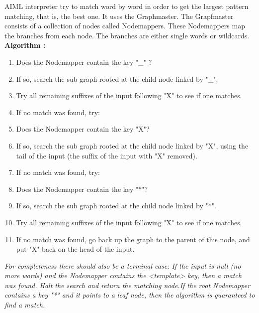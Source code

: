 \documentclass[12pt,twoside]{article}
\theoremstyle{plain}
\theoremstyle{definition}
\theoremstyle{remark}
\begin{document}
		AIML interpreter try to match word by word in order to get the largest pattern matching, that is, the best one. It uses the Graphmaster. The Grapfmaster consists of a collection of nodes called Nodemappers. These Nodemappers map the branches from each node. The branches are either single words or wildcards. \\ 
		
\textbf{Algorithm : } 
		
		\begin{enumerate} 
		\item Does the Nodemapper contain the key "\_" ?

			\item If so, search the sub graph rooted at the child node linked by "\_".	

		 		\item Try all remaining suffixes of the input following "X" to see if one matches. 
	 			
			\item If no match was found, try:

				\item Does the Nodemapper contain the key "X"? 

					\item If so, search the sub graph rooted at the child node linked by "X", using the tail of the input (the suffix of the input with "X" removed). 
					\item If no match was found, try: 

						\item Does the Nodemapper contain the key "*"? 
						
							\item If so, search the sub graph rooted at the child node linked by "*". 
					\item Try all remaining suffixes of the input following "X" to see if one matches. 
							\item If no match was found, go back up the graph to the parent of this node, and put "X" back on the head of the input. 
							
							\end{enumerate}

						\textit {For completeness there should also be a terminal case: If the input is null (no more words) and the Nodemapper contains the <template> key, then a match was found. Halt the search and return the matching node.If the root Nodemapper contains a key "*" and it points to a leaf node, then the algorithm is guaranteed to find a match.}
						
\end{document}
